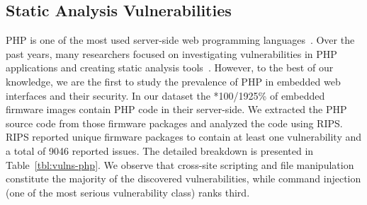 \documentclass[conference]{./templates/ndss/IEEEtran}
\newcounter{t0d0_counter}
\newcounter{pr00f_counter}
\newcommand\printpercent[2]{\the\numexpr#1*100/#2\%}
\newcommand{\countfirmwarewebTP}{1925}
\newcommand{\CountFirmwarePhp}{150}
\newcommand{\countfirmwarephpripstotal}{9046}
\begin{document}
\subsection{Static Analysis Vulnerabilities}
\label{sec:case-php}


PHP is one of the most used server-side web programming 
languages~\cite{php-usage}. 
Over the past years, many researchers focused on investigating vulnerabilities
in PHP applications and creating static analysis tools~\cite{Dahse:rips:ndss14, jovanovic2006pixy}.
However, to the best of our knowledge, we are the first to  
study the prevalence of PHP in embedded web interfaces and their security. 
In our dataset the \printpercent{\CountFirmwarePhp}{\countfirmwarewebTP} of embedded firmware images 
contain PHP code in their server-side.
    We extracted the PHP source code from those firmware packages and analyzed the code using RIPS. 
RIPS reported \countfirmwarephpfwripsvuln{} unique 
firmware packages to contain at least one vulnerability and a total of
\countfirmwarephpripstotal{} reported issues. 
The detailed breakdown is presented in 
Table~\ref{tbl:vulns-php}. We observe that cross-site scripting and file manipulation
constitute the majority of the discovered vulnerabilities, while command injection 
(one of the most serious vulnerability class) ranks third. 
\end{document}
